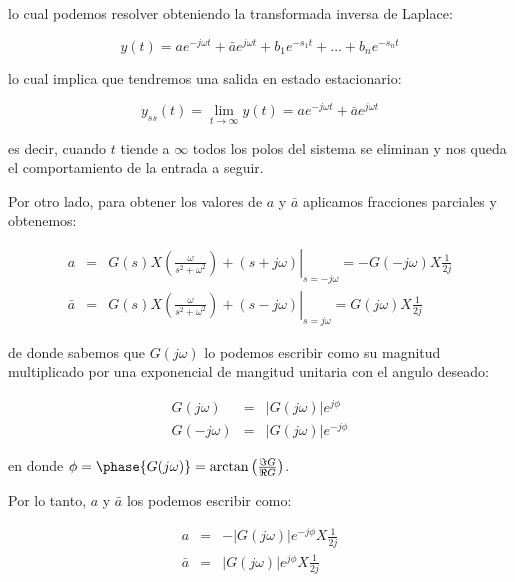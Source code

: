     lo cual podemos resolver obteniendo la transformada inversa de Laplace:

    \begin{equation*}
        y(t) = a e^{-j \omega t} + \bar{a} e^{j \omega t} + b_1 e^{-s_1 t} + \dots + b_n e^{-s_n t}
    \end{equation*}

    lo cual implica que tendremos una salida en estado estacionario:

    \begin{equation*}
        y_{ss}(t) = \lim_{t \to \infty} y(t) = a e^{-j \omega t} + \bar{a} e ^{j \omega t}
    \end{equation*}

    es decir, cuando $t$ tiende a $\infty$ todos los polos del sistema se eliminan y nos queda el comportamiento de la entrada a seguir.

    Por otro lado, para obtener los valores de $a$ y $\bar{a}$ aplicamos fracciones parciales y obtenemos:

    \begin{eqnarray*}
        a & = & \left. G(s) X \left( \frac{\omega}{s^2 + \omega^2} \right) + (s + j \omega) \right|_{s=-j \omega} = - G(-j \omega) X \frac{1}{2j} \\
        \bar{a} & = & \left. G(s) X \left( \frac{\omega}{s^2 + \omega^2} \right) + (s - j \omega) \right|_{s=j \omega} = G(j \omega) X \frac{1}{2j}
    \end{eqnarray*}

    de donde sabemos que $G(j \omega)$ lo podemos escribir como su magnitud multiplicado por una exponencial de mangitud unitaria con el angulo deseado:

    \begin{eqnarray*}
        G(j \omega) & = & \left| G(j \omega) \right| e^{j \phi} \\
        G(-j \omega) & = & \left| G(j \omega) \right| e^{-j \phi}
    \end{eqnarray*}

    en donde $\phi = \phase{G(j \omega)} = \arctan{\left( \frac{\Im{G}}{\Re{G}} \right)}$.

    Por lo tanto, $a$ y $\bar{a}$ los podemos escribir como:

    \begin{eqnarray*}
        a & = & - \left| G(j \omega) \right| e^{-j \phi} X \frac{1}{2j} \\
        \bar{a} & = & \left| G(j \omega) \right| e^{j \phi} X \frac{1}{2j}
    \end{eqnarray*}

